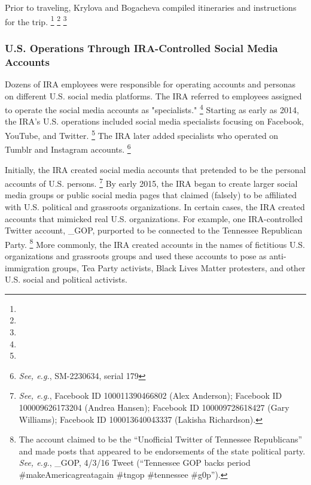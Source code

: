Prior to traveling, Krylova and Bogacheva compiled itineraries and instructions for the trip.
\footnote{}
\footnote{}
\footnote{}

\subsubsection{U.S. Operations Through IRA-Controlled Social Media Accounts}

Dozens of IRA employees were responsible for operating accounts and personas on different U.S. social media platforms.
The IRA referred to employees assigned to operate the social media accounts as "specialists."%
\footnote{}
Starting as early as 2014, the IRA's U.S. operations included social media specialists focusing on Facebook, YouTube, and Twitter.%
\footnote{}
The IRA later added specialists who operated on Tumblr and Instagram accounts.%
\footnote{\textit{See, e.g.}, SM-2230634, serial 179}

Initially, the IRA created social media accounts that pretended to be the personal accounts of U.S. persons.%
\footnote{\textit{See, e.g.}, Facebook ID 100011390466802 (Alex Anderson);
Facebook ID 100009626173204 (Andrea Hansen);
Facebook ID 100009728618427 (Gary Williams);
Facebook ID 100013640043337 (Lakisha Richardson).}
By early 2015, the IRA began to create larger social media groups or public social media pages that claimed (falsely) to be affiliated with U.S. political and grassroots organizations.
In certain cases, the IRA created accounts that mimicked real U.S. organizations.
For example, one IRA-controlled Twitter account, \@TEN\_GOP, purported to be connected to the Tennessee Republican Party.%
\footnote{The account claimed to be the “Unofficial Twitter of Tennessee Republicans” and made posts that appeared to be endorsements of the state political party.
\textit{See, e.g.}, \@TEN\_GOP, 4/3/16 Tweet (“Tennessee GOP backs \@realDonaldTrump period \#makeAmericagreatagain \#tngop \#tennessee \#g0p”).}
More commonly, the IRA created accounts in the names of fictitious U.S. organizations and grassroots groups and used these accounts to pose as anti-immigration groups, Tea Party activists, Black Lives Matter protesters, and other U.S. social and political activists.

